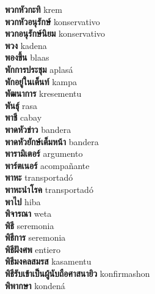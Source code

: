\textbf{ พวกหัวกะทิ  } krem \\
\textbf{ พวกหัวอนุรักษ์  } konservativo \\
\textbf{ พวกอนุรักษ์นิยม  } konservativo \\
\textbf{ พวง  } kadena \\
\textbf{ พองขึ้น  } blaas \\
\textbf{ พักการประชุม  } aplasá \\
\textbf{ พักอยู่ในเต็นท์  } kampa \\
\textbf{ พัฒนาการ  } kresementu \\
\textbf{ พันธุ์  } rasa \\
\textbf{ พาชี  } cabay \\
\textbf{ พาดหัวข่าว  } bandera \\
\textbf{ พาดหัวยักษ์เต็มหน้า  } bandera \\
\textbf{ พารามิเตอร์  } argumento \\
\textbf{ พาร์ตเนอร์  } acompañante \\
\textbf{ พาหะ  } transportadó \\
\textbf{ พาหะนำโรค  } transportadó \\
\textbf{ พาไป  } hiba \\
\textbf{ พิจารณา  } weta \\
\textbf{ พิธี  } seremonia \\
\textbf{ พิธีการ  } seremonia \\
\textbf{ พิธีฝังศพ  } entiero \\
\textbf{ พิธีมงคลสมรส  } kasamentu \\
\textbf{ พิธีรับเข้าเป็นผู้นับถือศาสนายิว  } konfirmashon \\
\textbf{ พิพากษา  } kondená \\
